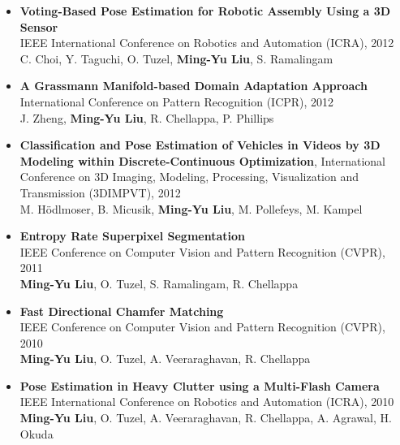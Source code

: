 \documentclass[10pt,letterpaper]{article}
\begin{document}
\begin{itemize}
\item           {\bf Voting-Based Pose Estimation for Robotic Assembly Using a 3D Sensor}\\
                IEEE International Conference on Robotics and Automation (ICRA), 2012\\
                C. Choi, Y. Taguchi, O. Tuzel, {\bf Ming-Yu Liu}, S. Ramalingam\vspace{-2mm}               

\item           {\bf A Grassmann Manifold-based Domain Adaptation Approach}\\
                International Conference on Pattern Recognition (ICPR), 2012\\
                J. Zheng, {\bf Ming-Yu Liu}, R. Chellappa, P. Phillips\vspace{-2mm}
                
\item           {\bf Classification and Pose Estimation of Vehicles in Videos by 3D Modeling within Discrete-Continuous Optimization}, 
                International Conference on 3D Imaging, Modeling, Processing, Visualization and Transmission (3DIMPVT), 2012\\
                M. Hödlmoser, B. Micusik, {\bf Ming-Yu Liu}, M. Pollefeys, M. Kampel\vspace{-2mm}

\item           {\bf Entropy Rate Superpixel Segmentation}\\
                IEEE Conference on Computer Vision and Pattern Recognition (CVPR), 2011\\
                {\bf Ming-Yu Liu}, O. Tuzel, S. Ramalingam, R. Chellappa\vspace{-2mm}
                
\item           {\bf Fast Directional Chamfer Matching}\\
                IEEE Conference on Computer Vision and Pattern Recognition (CVPR), 2010\\
                {\bf Ming-Yu Liu}, O. Tuzel, A. Veeraraghavan, R. Chellappa\vspace{-2mm}
                
\item           {\bf Pose Estimation in Heavy Clutter using a Multi-Flash Camera}\\
                IEEE International Conference on Robotics and Automation (ICRA), 2010\\
                {\bf Ming-Yu Liu}, O. Tuzel, A. Veeraraghavan, R. Chellappa, A. Agrawal, H. Okuda\vspace{-2mm}

\end{itemize}
\end{document}

